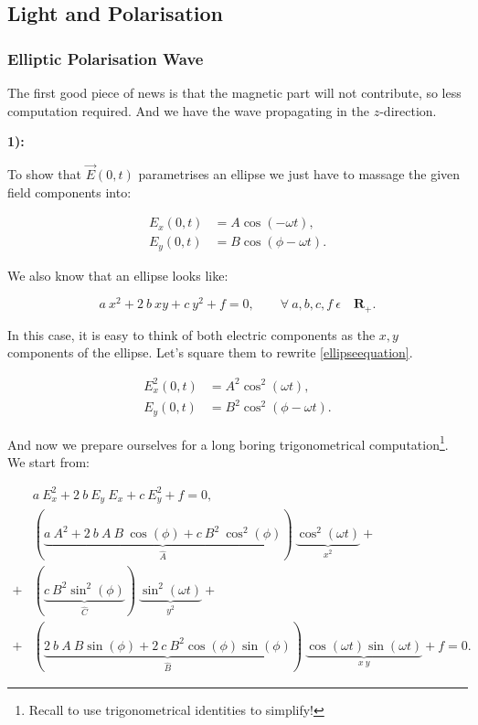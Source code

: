 \subsection{Light and Polarisation}

\subsubsection{Elliptic Polarisation Wave}\label{EllipticPolarisationWave}

The first good piece of news is that the magnetic part will not contribute, so less computation required. And we have the wave propagating in the $z$-direction.

\textbf{1):}

To show that $\vec{E}(0,t)$ parametrises an ellipse we just have to massage the given field components into:

\begin{equation}
	\begin{split}
		E_{x}(0,t)&= A \cos (-\omega t),\\
		E_{y}(0,t) & = B \cos (\phi - \omega t).
	\end{split}
\end{equation}

We also know that an ellipse looks like:

\begin{equation}\label{ellipseequation}
	a\: x^{2} + 2\: b\: xy + c \: y^{2} + f =0, \quad \quad \forall \: a,b,c,f \: \epsilon \quad \mathbf{R}_{+}.
\end{equation}

In this case, it is easy to think of both electric components as the $x,y$ components of the ellipse. Let's square them to rewrite \ref{ellipseequation}.

\begin{equation}
	\begin{split}
		E_{x}^{2}(0,t)&= A^{2} \cos^{2} (\omega t),\\
		E_{y}(0,t) & = B^{2} \cos^{2} (\phi - \omega t).
	\end{split}
\end{equation}

And now we prepare ourselves for a long boring trigonometrical computation\footnote{Recall to use trigonometrical identities to simplify!}. We start from:

\begin{equation}\label{EllipseMassage}
	\begin{split}
		&a \: E_{x}^{2} + 2\: b\: E_{y}\: E_{x} + c \: E_{y}^{2} +f =0,\\
		&\left(\underbrace{a \: A^{2} + 2 \: b \: A \: B \: \cos(\phi) + c \: B^{2} \: \cos^{2}(\phi)}_{\hat{A}}\right) \: \underbrace{\cos^{2} (\omega t)}_{x^{2}} +\\
		+& \left(\underbrace{c \: B^{2} \sin^{2}(\phi)}_{\hat{C}}\right)\: \underbrace{\sin^{2} (\omega t)}_{y^{2}} +\\
		+& \left(\underbrace{2 \: b \: A \: B \sin(\phi) + 2 \: c \: B^{2} \cos(\phi) \sin(\phi)}_{\hat{B}}\right)\: \underbrace{\cos (\omega t) \sin (\omega t)}_{x \: y} + f =0.
	\end{split}
\end{equation}

